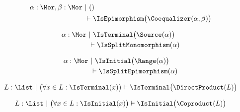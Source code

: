 \begin{sequent}
\begin{align*}
  \alpha:\Mor, \beta:\Mor  ~&|~ () \\
  &\vdash \IsEpimorphism\big( \Coequalizer( \alpha, \beta ) \big)
\end{align*}
\end{sequent}

\begin{sequent}\label{sequent:no_proper_context_7}
\begin{align*}
  \alpha:\Mor ~&|~ \IsTerminal\big( \Source( \alpha ) \big)\\
  &\vdash \IsSplitMonomorphism( \alpha )
\end{align*}
\end{sequent}

\begin{sequent}\label{sequent:no_proper_context_8}
\begin{align*}
  \alpha:\Mor ~&|~ \IsInitial\big( \Range( \alpha ) \big)\\
  &\vdash \IsSplitEpimorphism( \alpha )
\end{align*}
\end{sequent}

\begin{sequent}
\begin{align*}
  L: \List ~|~ \big(\forall x \in L: \IsTerminal(x)\big) \vdash \IsTerminal\big( \DirectProduct( L ) \big)
\end{align*}
\end{sequent}

\begin{sequent}
\begin{align*}
  L: \List ~|~ \big(\forall x \in L: \IsInitial(x)\big) \vdash \IsInitial\big( \Coproduct( L ) \big)
\end{align*}
\end{sequent}



